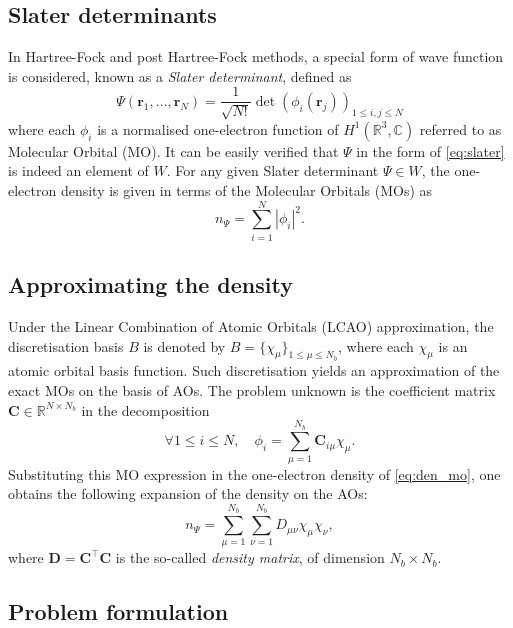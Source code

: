 \documentclass[a4paper,11pt]{article}
\begin{document}
\subsection{Slater determinants}

In Hartree-Fock and post Hartree-Fock methods, a special form of wave function
is considered, known as a \textit{Slater determinant}, defined as
\begin{equation}
    \label{eq:slater}
    \Psi(\bm r_1,\ldots,\bm r_N) = \frac{1}{\sqrt{N!}}
    \det\left(\phi_i(\bm r_j)\right)_{1\leq i,j\leq N}
\end{equation}
where each $\phi_i$ is a normalised one-electron function of $H^1(\mathbb
R^3,\mathbb C)$ referred to as Molecular Orbital (MO). It can be easily verified
that $\Psi$ in the form of \cref{eq:slater} is indeed an element of $W$.
For any given Slater determinant $\Psi\in W$, the one-electron density is 
given in terms of the Molecular Orbitals (MOs) as
\begin{equation}
    \label{eq:den_mo}
    n_{\Psi} = \sum_{i=1}^N |\phi_i|^2.
\end{equation}

\subsection{Approximating the density}

Under the Linear Combination of Atomic Orbitals (LCAO) 
approximation, the discretisation basis $B$ is denoted by
$B=\{\chi_{\mu}\}_{1\leq \mu\leq N_b}$, where each $\chi_{\mu}$ is an atomic
orbital basis function. Such discretisation yields an approximation of the 
exact MOs on the basis of AOs. The problem unknown is the 
coefficient matrix $\bm C\in\mathbb R^{N\times N_b}$ in the
decomposition
\[
    \forall 1\leq i\leq N, \quad \phi_i = \sum_{\mu=1}^{N_b} \bm C_{i\mu}
    \chi_{\mu}.
\]
Substituting this MO expression in the one-electron density of \cref{eq:den_mo},
one obtains the following expansion of the density on the AOs:
\begin{equation}
    \label{eq:n_prod}
    n_{\Psi} = \sum_{\mu=1}^{N_b}\sum_{\nu=1}^{N_b} D_{\mu\nu} \chi_\mu\chi_\nu,
\end{equation}
where $\bm D = \bm C^\top \bm C$ is the so-called \textit{density matrix}, of
dimension $N_b\times N_b$.

\subsection{Problem formulation}
\end{document}
